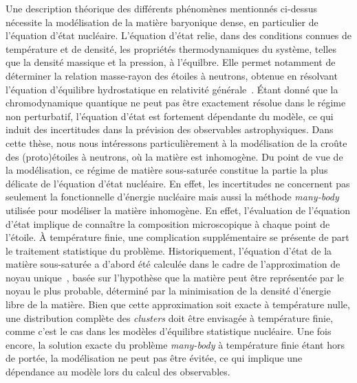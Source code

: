 Une description théorique des différents phénomènes mentionnés ci-dessus 
nécessite la modélisation de la matière baryonique dense, en particulier de 
l'équation d'état nucléaire. 
%
L'équation d'état relie, dans des conditions connues de température et 
de densité, les propriétés thermodynamiques du système, telles que la densité 
massique et la pression, à l'équilbre. Elle permet notamment de déterminer la 
relation masse-rayon des étoiles à neutrons, obtenue en résolvant l'équation 
d'équilibre hydrostatique en relativité 
générale~\cite{Tolman1939,Oppenheimer1939}.
%
Étant donné que la chromodynamique quantique ne peut pas être exactement 
résolue dans le régime non perturbatif, l'équation d'état est fortement 
dépendante du modèle, ce qui induit des incertitudes dans la prévision des 
observables astrophysiques. 
Dans cette thèse, nous nous intéressons particulièrement à la modélisation de 
la croûte des (proto)étoiles à neutrons, où la matière est inhomogène. Du point 
de vue de la modélisation, ce régime de matière sous-saturée constitue la 
partie la plus délicate de l'équation d'état nucléaire. 
En effet, les incertitudes ne concernent pas 
seulement la fonctionnelle d'énergie nucléaire mais aussi la méthode
\textit{many-body} utilisée pour modéliser la matière inhomogène. 
%
En effet, l'évaluation de l'équation d'état implique de connaître la 
composition microscopique à chaque point de l'étoile. 
À température finie, une complication supplémentaire se présente de part le 
traitement statistique du problème. 
Historiquement, l'équation d'état de la matière sous-saturée a d'abord été 
calculée dans le cadre de l'approximation de noyau 
unique~\cite{BBP,Negele1973}, basée sur l'hypothèse que la matière 
peut être représentée par le noyau le plus probable, déterminé par la 
minimisation de la densité d'énergie libre de la matière. Bien que cette 
approximation soit exacte à température nulle, une distribution complète des 
\textit{clusters} doit être envisagée à température finie, comme c'est le cas 
dans les modèles d'équilibre statistique nucléaire. 
Une fois encore, la solution exacte du problème \textit{many-body} à 
température finie étant hors de portée, la modélisation ne peut pas être 
évitée, ce qui implique une dépendance au modèle lors du calcul des 
observables. 

